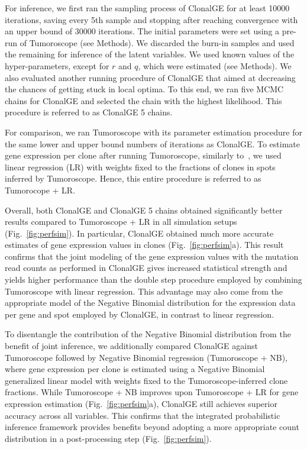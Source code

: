 \documentclass[unnumsec,webpdf,contemporary,large]{oup-authoring-template}%
\theoremstyle{thmstyleone}%
\theoremstyle{thmstyletwo}%
\theoremstyle{thmstylethree}%
\newcommand{\rev}[1]{{\color{revisionblue}#1}}
\begin{document}
 For inference, we first ran the sampling process of ClonalGE for at least 10000 iterations, saving every 5th sample and stopping after reaching convergence with an upper bound of 30000 iterations. The initial parameters were set using a pre-run of Tumoroscope (see Methods). We discarded the burn-in samples and used the remaining for inference of the latent variables. We used known values of the hyper-parameters, except for $r$ and $q$, which were estimated (see Methods). We also evaluated another running procedure of ClonalGE that aimed at decreasing the chances of getting stuck in local optima. To this end, we ran five MCMC chains for ClonalGE and selected the chain with the highest likelihood. This procedure is referred to as ClonalGE 5 chains.

For comparison, we ran Tumoroscope with its parameter estimation procedure for the same lower and upper bound numbers of iterations as ClonalGE. 
To estimate gene expression per clone after running Tumoroscope, 
similarly to~\cite{shafighi2024integrative}, we used linear regression (LR) with weights fixed to the  fractions of clones in spots inferred by Tumoroscope. Hence, this entire procedure is referred to as Tumorocope + LR.   

Overall, both ClonalGE and ClonalGE 5 chains obtained significantly better results compared to Tumoroscope + LR in all simulation setups (Fig.~\ref{fig:perfsim}). In particular, ClonalGE obtained much more accurate estimates of gene expression values in clones (Fig.~\ref{fig:perfsim}a). This result confirms that the joint modeling of the gene expression values
with the mutation read counts as performed in ClonalGE gives increased statistical strength and yields higher performance than the double step procedure employed by combining Tumoroscope with linear regression. This advantage may also come from the appropriate model of the Negative Binomial distribution for the expression data per gene and spot employed by ClonalGE, in contrast to linear regression.

\rev{To disentangle the contribution of the Negative Binomial distribution from the benefit of joint inference, we additionally compared ClonalGE against Tumoroscope followed by Negative Binomial regression (Tumoroscope + NB), where gene expression per clone is estimated using a Negative Binomial generalized linear model with weights fixed to the Tumoroscope-inferred clone fractions. While Tumoroscope + NB improves upon Tumoroscope + LR for gene expression estimation (Fig.~\ref{fig:perfsim}a), ClonalGE still achieves superior accuracy across all variables. This confirms that the integrated probabilistic inference framework provides benefits beyond adopting a more appropriate count distribution in a post-processing step (Fig.~\ref{fig:perfsim}).}
\end{document}
